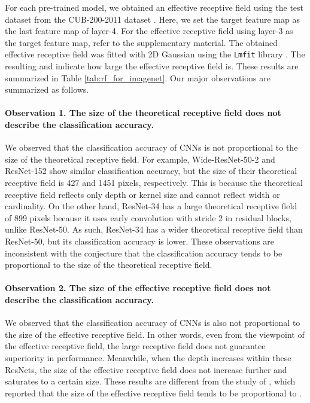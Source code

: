 \documentclass[letterpaper]{article} \usepackage{aaai22}  \usepackage{times}  \usepackage{helvet}  \usepackage{courier}  \usepackage[hyphens]{url}  \usepackage{graphicx} \urlstyle{rm} \def\UrlFont{\rm}  \usepackage{natbib}  \usepackage{caption} \DeclareCaptionStyle{ruled}{labelfont=normalfont,labelsep=colon,strut=off} \frenchspacing  \setlength{\pdfpagewidth}{8.5in}  \setlength{\pdfpageheight}{11in}  \usepackage{algorithm}
\begin{document}
For each pre-trained model, we obtained an effective receptive field using the test dataset from the CUB-200-2011 dataset \cite{wah2011caltech}. Here, we set the target feature map as the last feature map of  layer-4. For the effective receptive field using  layer-3 as the target feature map, refer to the supplementary material. The obtained effective receptive field was fitted with 2D Gaussian using the \texttt{Lmfit} library \cite{newville2016lmfit}. The resulting  and  indicate how large the effective receptive field is. These results are summarized in Table \ref{tab:rf_for_imagenet}. Our major observations are summarized as follows.
\paragraph{Observation 1. The size of the theoretical receptive field does not describe the classification accuracy.}
We observed that the classification accuracy of CNNs is not proportional to the size of the theoretical receptive field. For example, Wide-ResNet-50-2 and ResNet-152 show similar classification accuracy, but the size of their theoretical receptive field is 427 and 1451 pixels, respectively. This is because the theoretical receptive field reflects only depth or kernel size and cannot reflect width or cardinality. On the other hand, ResNet-34 has a large theoretical receptive field of 899 pixels because it uses early convolution with stride 2 in residual blocks, unlike ResNet-50. As such, ResNet-34 has a wider theoretical receptive field than ResNet-50, but its classification accuracy is lower. These observations are inconsistent with the conjecture \cite{araujo2019computing} that the classification accuracy tends to be proportional to the size of the theoretical receptive field.

\paragraph{Observation 2. The size of the effective receptive field does not describe the classification accuracy.}
We observed that the classification accuracy of CNNs is also not proportional to the size of the effective receptive field. In other words, even from the viewpoint of the effective receptive field, the large receptive field does not guarantee superiority in performance. Meanwhile, when the depth increases within these ResNets, the size of the effective receptive field does not increase further and saturates to a certain size. These results are different from the study of \citet{luo2016understanding}, which reported that the size of the effective receptive field tends to be proportional to .
\end{document}
